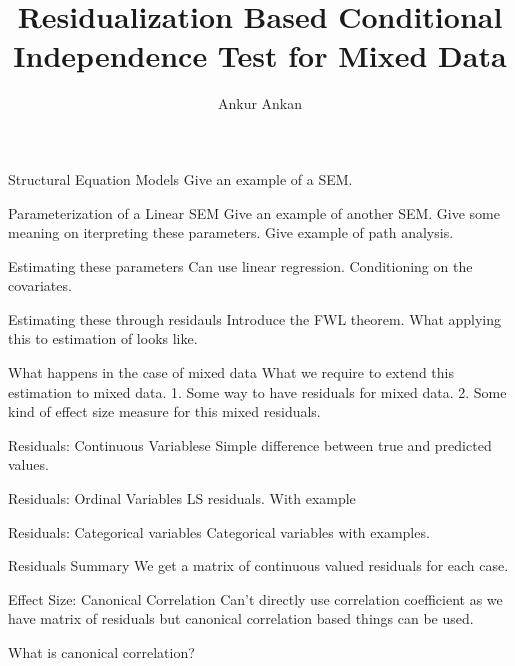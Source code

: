 \documentclass{beamer}
\begin{document}
\title[]{Residualization Based Conditional Independence Test for Mixed Data}
\author{Ankur Ankan}
\date{}

\maketitle

\begin{frame}{Structural Equation Models}
	Give an example of a SEM.
\end{frame}

\begin{frame}{Parameterization of a Linear SEM}
	Give an example of another SEM.
	Give some meaning on iterpreting these parameters.
	Give example of path analysis.
\end{frame}

\begin{frame}{Estimating these parameters}
	Can use linear regression.
	Conditioning on the covariates.
\end{frame}

\begin{frame}{Estimating these through residauls}
	Introduce the FWL theorem.
	What applying this to estimation of looks like.
\end{frame}

\begin{frame}{What happens in the case of mixed data}
	What we require to extend this estimation to mixed data.
	1. Some way to have residuals for mixed data.
	2. Some kind of effect size measure for this mixed residuals.
\end{frame}

\begin{frame}{Residuals: Continuous Variablese}
	Simple difference between true and predicted values.
\end{frame}

\begin{frame}{Residuals: Ordinal Variables}
	LS residuals. With example
\end{frame}

\begin{frame}{Residuals: Categorical variables}
	Categorical variables with examples.
\end{frame}

\begin{frame}{Residuals Summary}
	We get a matrix of continuous valued residuals for each case.
\end{frame}

\begin{frame}{Effect Size: Canonical Correlation}
	Can't directly use correlation coefficient as we have matrix of
	residuals but canonical correlation based things can be used.

	What is canonical correlation?
\end{frame}
\end{document}
